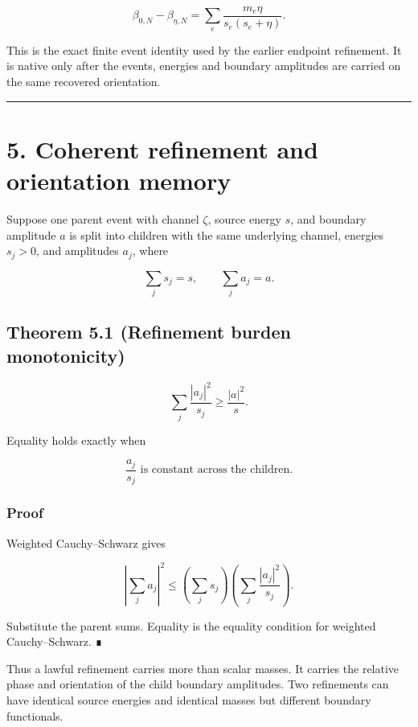 \[
\boxed{
\beta_{0,N}-\beta_{\eta,N}
=\sum_e
\frac{m_e\eta}{s_e(s_e+\eta)}.
}
\]

This is the exact finite event identity used by the earlier endpoint refinement.
It is native only after the events, energies and boundary amplitudes are carried
on the same recovered orientation.

\begin{center}\rule{0.5\linewidth}{0.5pt}\end{center}

\hypertarget{coherent-refinement-and-orientation-memory}{%
\section{5. Coherent refinement and orientation memory}\label{coherent-refinement-and-orientation-memory}}

Suppose one parent event with channel \(\zeta\), source energy \(s\), and
boundary amplitude \(a\) is split into children with the same underlying
channel, energies \(s_j>0\), and amplitudes \(a_j\), where

\[
\sum_j s_j=s,
\qquad
\sum_j a_j=a.
\]

\hypertarget{theorem-5.1-refinement-burden-monotonicity}{%
\subsection{Theorem 5.1 (Refinement burden monotonicity)}\label{theorem-5.1-refinement-burden-monotonicity}}

\[
\boxed{
\sum_j\frac{|a_j|^2}{s_j}
\ge
\frac{|a|^2}{s}.
}
\]

Equality holds exactly when

\[
\boxed{
\frac{a_j}{s_j}
\text{ is constant across the children.}
}
\]

\hypertarget{proof-1}{%
\subsubsection{Proof}\label{proof-1}}

Weighted Cauchy--Schwarz gives

\[
\left|\sum_j a_j\right|^2
\le
\left(\sum_j s_j\right)
\left(\sum_j\frac{|a_j|^2}{s_j}\right).
\]

Substitute the parent sums. Equality is the equality condition for weighted
Cauchy--Schwarz. ∎

Thus a lawful refinement carries more than scalar masses. It carries the
relative phase and orientation of the child boundary amplitudes. Two
refinements can have identical source energies and identical masses but different
boundary functionals.

